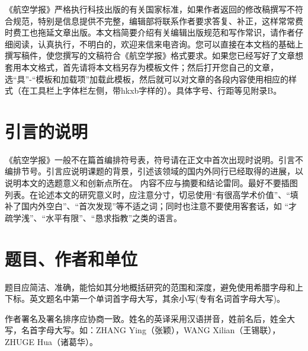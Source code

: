\documentclass[10.5pt,twocolumn]{aaas}
\begin{document}
\wuhao 


《航空学报》\enlargethispage{-3.0cm}严格执行科技出版的有关国家标准，如果作者返回的修改稿撰写不符合规范，特别是信息提供不完整，编辑部将联系作者要求答复、补正，这样常常费时费工也拖延文章出版。本文档简要介绍有关编辑出版规范和写作常识，请作者仔细阅读，认真执行，不明白的，欢迎来信来电咨询。您可以直接在本文档的基础上撰写稿件，使您撰写的文稿符合《航空学报》格式要求。如果您已经写好了文章想套用本文格式，首先请将本文档另存为模板文件；然后打开您自己的文章，选“具”-“模板和加载项”加载此模板，然后就可以对文章的各段内容使用相应的样式（在工具栏上字体栏左侧，带hkxb字样的）。具体字号、行距等见附录B。\enlargethispage{-3.0cm}

\section{引言的说明}
《航空学报》一般不在篇首编排符号表，符号请在正文中首次出现时说明。引言不编排节号。引言应说明课题的背景，引述该领域的国内外同行已经取得的进展，以说明本文的选题意义和创新点所在。 内容不应与摘要和结论雷同。最好不要插图列表。在论述本文的研究意义时，应注意分寸，切忌使用“有很高学术价值”、“填补了国内外空白”、“首次发现”等不适之词；同时也注意不要使用客套话，如 “才疏学浅”、“水平有限”、“恳求指教”之类的语言。

\section{题目、作者和单位}

题目应简洁、准确，能恰如其分地概括研究的范围和深度，避免使用希腊字母和上下标。英文题名中第一个单词首字母大写，其余小写(专有名词首字母大写)。

作者署名及署名排序应协商一致。姓名的英译采用汉语拼音，姓前名后，姓全大写，名首字母大写。如：ZHANG Ying（张颖），WANG Xilian（王锡联），ZHUGE Hua（诸葛华）。
\end{document}
